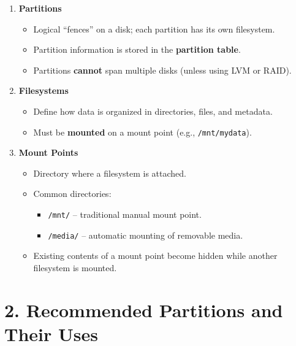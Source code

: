 \documentclass[12pt,a4paper]{report}
\begin{document}
\begin{enumerate}
    \item \textbf{Partitions}
    \begin{itemize}
        \item Logical “fences” on a disk; each partition has its own filesystem.
        \item Partition information is stored in the \textbf{partition table}.
        \item Partitions \textbf{cannot} span multiple disks (unless using LVM or RAID).
    \end{itemize}

    \item \textbf{Filesystems}
    \begin{itemize}
        \item Define how data is organized in directories, files, and metadata.
        \item Must be \textbf{mounted} on a mount point (e.g., \texttt{/mnt/mydata}).
    \end{itemize}

    \item \textbf{Mount Points}
    \begin{itemize}
        \item Directory where a filesystem is attached.
        \item Common directories:
        \begin{itemize}
            \item \texttt{/mnt/} – traditional manual mount point.
            \item \texttt{/media/} – automatic mounting of removable media.
        \end{itemize}
        \item Existing contents of a mount point become hidden while another filesystem is mounted.
    \end{itemize}
\end{enumerate}

\section*{2. Recommended Partitions and Their Uses}
\end{document}
